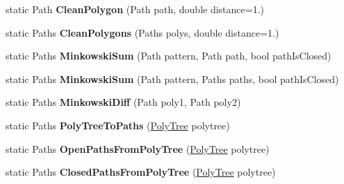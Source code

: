 \begin{DoxyCompactItemize}
static Path {\bfseries Clean\+Polygon} (Path path, double distance=1.)
\item 
\mbox{\label{class_super_tiled2_unity_1_1_editor_1_1_clipper_lib_1_1_clipper_aa63a922831cae446f559ec46cd4006c8}} 
static Paths {\bfseries Clean\+Polygons} (Paths polys, double distance=1.)
\item 
\mbox{\label{class_super_tiled2_unity_1_1_editor_1_1_clipper_lib_1_1_clipper_a66d28ba400ee4a920b9ba6f74661f763}} 
static Paths {\bfseries Minkowski\+Sum} (Path pattern, Path path, bool path\+Is\+Closed)
\item 
\mbox{\label{class_super_tiled2_unity_1_1_editor_1_1_clipper_lib_1_1_clipper_ac47c5af226820ec49a70a4201459f05f}} 
static Paths {\bfseries Minkowski\+Sum} (Path pattern, Paths paths, bool path\+Is\+Closed)
\item 
\mbox{\label{class_super_tiled2_unity_1_1_editor_1_1_clipper_lib_1_1_clipper_a15d3a99594ca111ab448352afd826693}} 
static Paths {\bfseries Minkowski\+Diff} (Path poly1, Path poly2)
\item 
\mbox{\label{class_super_tiled2_unity_1_1_editor_1_1_clipper_lib_1_1_clipper_a104d69bfeeaae82fb0dd3f261057f1c0}} 
static Paths {\bfseries Poly\+Tree\+To\+Paths} (\mbox{\hyperlink{class_super_tiled2_unity_1_1_editor_1_1_clipper_lib_1_1_poly_tree}{Poly\+Tree}} polytree)
\item 
\mbox{\label{class_super_tiled2_unity_1_1_editor_1_1_clipper_lib_1_1_clipper_a141d4b1fc2895924d411a7c2de2e2e18}} 
static Paths {\bfseries Open\+Paths\+From\+Poly\+Tree} (\mbox{\hyperlink{class_super_tiled2_unity_1_1_editor_1_1_clipper_lib_1_1_poly_tree}{Poly\+Tree}} polytree)
\item 
\mbox{\label{class_super_tiled2_unity_1_1_editor_1_1_clipper_lib_1_1_clipper_a9938c42399d1fec9291e7f095e1ad859}} 
static Paths {\bfseries Closed\+Paths\+From\+Poly\+Tree} (\mbox{\hyperlink{class_super_tiled2_unity_1_1_editor_1_1_clipper_lib_1_1_poly_tree}{Poly\+Tree}} polytree)
\end{DoxyCompactItemize}
